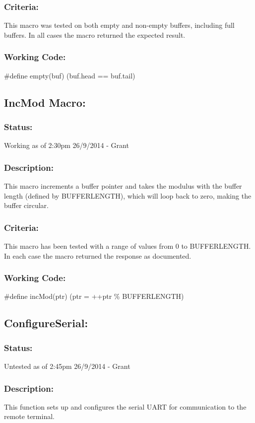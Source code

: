 \documentclass[]{article}
\begin{document}
\subsubsection{Criteria:}
This macro was tested on both empty and non-empty buffers, including full buffers. In all cases the macro returned the expected result.

\subsubsection{Working Code:}
\#define empty(buf) (buf.head == buf.tail)

\subsection{IncMod Macro:}
\subsubsection{Status:}
Working as of 2:30pm 26/9/2014 - Grant

\subsubsection{Description:}
This macro increments a buffer pointer and takes the modulus with the buffer length (defined by BUFFERLENGTH), which will loop back to zero, making the buffer circular.

\subsubsection{Criteria:}
This macro has been tested with a range of values from 0 to BUFFERLENGTH. In each case the macro returned the response as documented.

\subsubsection{Working Code:}
\#define incMod(ptr) (ptr = ++ptr \% BUFFERLENGTH)

\subsection{ConfigureSerial:}
\subsubsection{Status:}
Untested as of 2:45pm 26/9/2014 - Grant

\subsubsection{Description:}
This function sets up and configures the serial UART for communication to the remote terminal.
\end{document}
